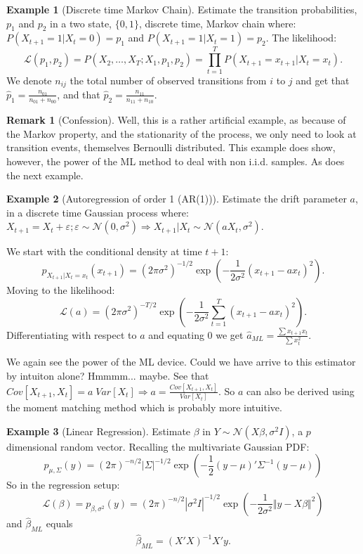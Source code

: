 \documentclass[12pt,a4paper]{article}
\theoremstyle{plain}
\theoremstyle{definition}
\newtheorem{remark}{Remark}
\newtheorem{example}{Example}
\newcommand{\gauss}[1]{\mathcal{N}\left(#1\right)}
\newcommand{\norm}[1]{\Vert #1 \Vert}
\newcommand{\lik}{\mathcal{L}}
\begin{document}
\begin{example}[Discrete time Markov Chain]

Estimate the transition probabilities,  $p_1$ and $p_2$ in a two state, $\{0,1\}$, discrete time, Markov chain where:
$P(X_{t+1}=1|X_{t}=0)=p_1$ and $P(X_{t+1}=1|X_{t}=1)=p_2$.
The likelihood:
$$
  \lik(p_1,p_2)=
  P(X_2,\dots,X_T;X_1,p_1,p_2)=
  \prod_{t=1}^T P(X_{t+1}=x_{t+1}|X_{t}=x_t).
$$
We denote $n_{ij}$ the total number of observed transitions from $i$ to $j$ and get that $\hat{p}_1=\frac{n_{01}}{n_{01}+n_{00}}$, and that $\hat{p}_2=\frac{n_{11}}{n_{11}+n_{10}}$.

\begin{remark}[Confession]
Well, this is a rather artificial example, as because of the Markov property, and the stationarity of the process, we only need to look at transition events, themselves Bernoulli distributed. 
This example does show, however, the power of the ML method to deal with non i.i.d. samples. As does the next example.
\end{remark}
\end{example}




\begin{example}[Autoregression of order 1 (AR(1))]
Estimate the drift parameter $a$,  in a discrete time Gaussian process where:
$X_{t+1}=X_t+\varepsilon; \varepsilon \sim \gauss{0,\sigma^2} \Rightarrow X_{t+1}|X_t \sim \gauss{a X_t,\sigma^2}$.

We start with the conditional density at time $t+1$:
$$
  p_{X_{t+1}|X_t=x_t}(x_{t+1}) = 
  (2 \pi \sigma^2)^{-1/2} \exp \left( 
    -\frac{1}{2 \sigma^2}(x_{t+1}-a x_t)^2 
  \right).
$$
Moving to the likelihood:
$$
  \lik(a) = 
  (2 \pi \sigma^2)^{-T/2} \exp \left(
    -\frac{1}{2 \sigma^2}\sum_{t=1}^T (x_{t+1}-a x_t)^2 
  \right).
$$
Differentiating with respect to $a$ and equating $0$ we get $\hat{a}_{ML}=\frac{\sum x_{t+1}x_{t}}{\sum x_t^2}$.

We again see the power of the ML device.
Could we have arrive to this estimator by intuiton alone? Hmmmm... maybe. 
See that $Cov[X_{t+1},X_t] = a \; Var[X_t] \Rightarrow a=\frac{Cov[X_{t+1},X_t]}{Var[X_t]}$.
So $a$ can also be derived using the moment matching method which is probably more intuitive.

\end{example}




\begin{example}[Linear Regression]

Estimate $\beta$ in $Y \sim \gauss{X\beta,\sigma^2 I}$, a $p$ dimensional random vector.
Recalling the multivariate Gaussian PDF:
$$
  p_{\mu,\Sigma}(y) = 
  (2 \pi)^{-n/2} |\Sigma|^{-1/2} \exp\left(
    -\frac{1}{2} (y-\mu)' \Sigma^{-1} (y-\mu)
  \right)
$$
So in the regression setup:
$$
  \lik(\beta)= 
  p_{\beta,\sigma^2}(y) = 
  (2 \pi)^{-n/2} |\sigma^2 I|^{-1/2} \exp\left(
    -\frac{1}{2 \sigma^2} \norm{y-X\beta}^2
  \right)
$$
and $\hat{\beta}_{ML}$ equals 
\begin{align}
	\hat{\beta}_{ML}=(X'X)^{-1} X'y.
\end{align}


\end{example}
\end{document}
